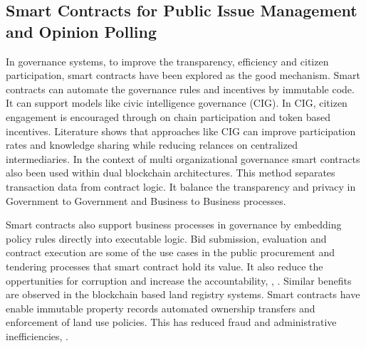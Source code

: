 \subsection{Smart Contracts for Public Issue Management and Opinion Polling}

In governance systems, to improve the transparency, efficiency and citizen participation, smart contracts have been explored as the good mechanism. Smart contracts can automate the governance rules and incentives by immutable code. It can support models like civic intelligence governance (CIG). In CIG, citizen engagement is encouraged through on chain participation and token based incentives\cite{MDPI_2023_CivicIntelligence}. Literature shows that approaches like CIG can improve participation rates and knowledge sharing while reducing relances on centralized intermediaries. In the context of multi organizational governance smart contracts also been used within dual blockchain architectures. This method separates transaction data from contract logic. It balance the transparency and privacy in Government to Government and Business to Business processes\cite{IEEE_2021_SmartCon}.


Smart contracts also support business processes in governance by embedding policy rules directly into executable logic. Bid submission, evaluation and contract execution are some of the use cases in the public procurement and tendering processes that smart contract hold its value. It also reduce the oppertunities for corruption and increase the accountability\cite{IEEE_2021_SmartCon}, \cite{GovernanceNow_2023_SmartContractsToolkit}, \cite{AICERTs_2023_FutureOfGovernance}. Similar benefits are observed in the blockchain based land registry systems. Smart contracts have enable immutable property records automated ownership transfers and enforcement of land use policies. This has reduced fraud and administrative inefficiencies\cite{ResearchGate_2020_LandRegistry}, \cite{MDPI_2023_NamibianLandRegistration}.

